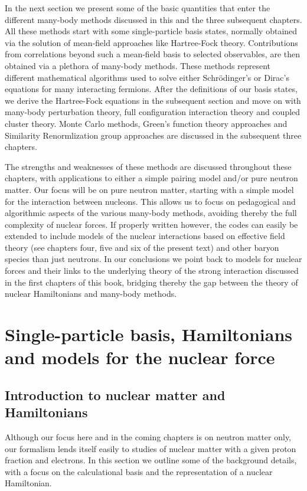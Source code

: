 In the next section we present some of the basic quantities that enter
the different many-body methods discussed in this and the three
subsequent chapters. All these methods start with some single-particle
basis states, normally obtained via the solution of mean-field
approaches like Hartree-Fock theory. Contributions from correlations
beyond such a mean-field basis to selected observables, are then
obtained via a plethora of many-body methods. These methods represent
different mathematical algorithms used to solve either
Schr\"{o}dinger's or Dirac's equations for many interacting
fermions. After the definitions of our basis states, we derive the
Hartree-Fock equations in the subsequent section and move on with
many-body perturbation theory, full configuration interaction theory
and coupled cluster theory.  Monte Carlo methods, Green's function
theory approaches and Similarity Renormlization group approaches are
discussed in the subsequent three chapters.

The strengths and weaknesses of these methods are discussed throughout
these chapters, with applications to either a simple pairing model
and/or pure neutron matter. Our focus will be on pure neutron matter,
starting with a simple model for the interaction between
nucleons. This allows us to focus on pedagogical and algorithmic
aspects of the various many-body methods, avoiding thereby the full
complexity of nuclear forces.  If properly written however, the codes
can easily be extended to include models of the nuclear interactions
based on effective field theory (see chapters four, five and six of
the present text) and other baryon species than just neutrons. In our
conclusions we point back to models for nuclear forces and their links
to the underlying theory of the strong interaction discussed in the
first chapters of this book, bridging thereby the gap between the
theory of nuclear Hamiltonians and many-body methods.


\section{Single-particle basis, Hamiltonians and models for the nuclear force}\label{sec:chap8forces}

\subsection{Introduction to nuclear matter and Hamiltonians}

Although our focus here and in the coming chapters is on neutron
matter only, our formalism lends itself easily to studies of nuclear
matter with a given proton fraction and electrons. In this section we
outline some of the background details, with a focus on the
calculational basis and the representation of a nuclear Hamiltonian.

